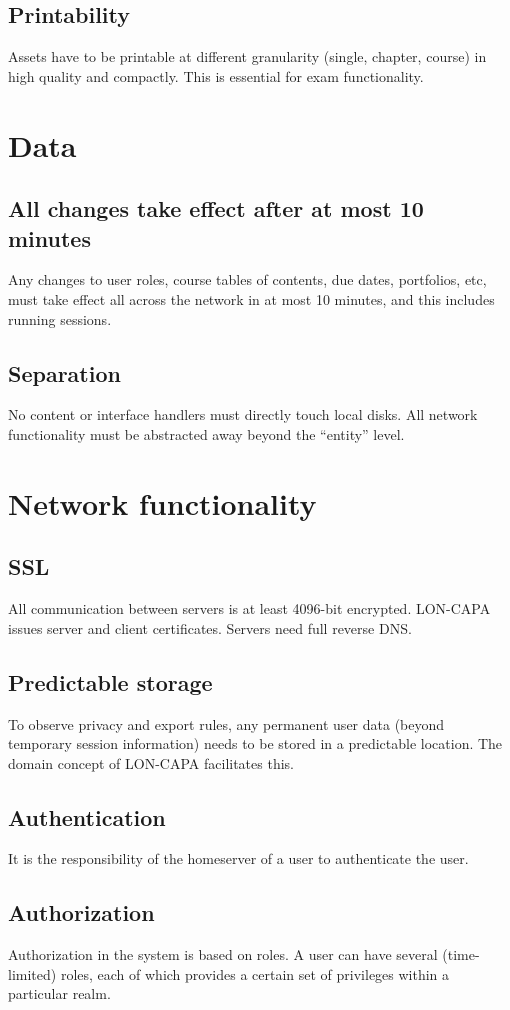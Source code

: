 \subsection{Printability}
Assets have to be printable at different granularity (single, chapter, course) in high quality and compactly. This is essential for exam functionality.
\section{Data}
\subsection{All changes take effect after at most 10 minutes}
Any changes to user roles, course tables of contents, due dates, portfolios, etc, must take effect all across the network in at most 10 minutes, and this includes running sessions.
\subsection{Separation}
No content or interface handlers must directly touch local disks. All network functionality must be abstracted away beyond the ``entity'' level.
\section{Network functionality}
\subsection{SSL}
All communication between servers is at least 4096-bit encrypted. LON-CAPA issues server and client certificates. Servers need full reverse DNS.
\subsection{Predictable storage}
To observe privacy and export rules, any permanent user data (beyond temporary session information) needs to be stored in a predictable location. The domain concept of LON-CAPA facilitates this.
\subsection{Authentication}
It is the responsibility of the homeserver of a user to authenticate the user.
\subsection{Authorization}
Authorization in the system is based on roles. A user can have several (time-limited) roles, each of which provides a certain set of privileges within a particular realm.

